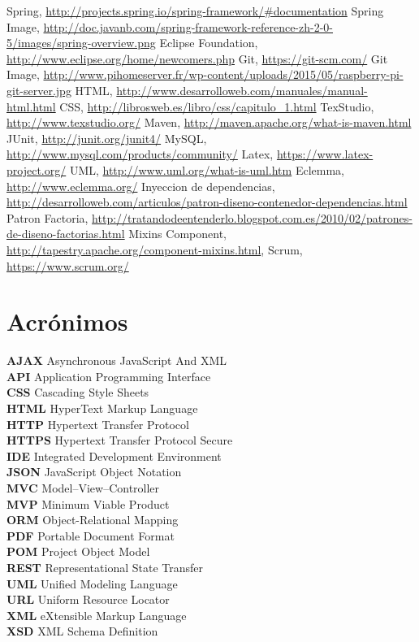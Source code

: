 \documentclass[12pt, a4paper, twoside]{book}
\begin{document}
	\begin{thebibliography}{99}
		Spring, \url{http://projects.spring.io/spring-framework/\#documentation}
		Spring Image,
		\url{http://doc.javanb.com/spring-framework-reference-zh-2-0-5/images/spring-overview.png}
		Eclipse Foundation, \url{http://www.eclipse.org/home/newcomers.php}
		Git, \url{https://git-scm.com/}
		Git Image, \url{http://www.pihomeserver.fr/wp-content/uploads/2015/05/raspberry-pi-git-server.jpg}
		HTML, \url{http://www.desarrolloweb.com/manuales/manual-html.html}
		CSS, \url{http://librosweb.es/libro/css/capitulo\_1.html}
		TexStudio, \url{http://www.texstudio.org/}
		Maven, \url{http://maven.apache.org/what-is-maven.html}
		JUnit, \url{http://junit.org/junit4/}
		MySQL, \url{http://www.mysql.com/products/community/}
		Latex, \url{https://www.latex-project.org/}
		UML, \url{http://www.uml.org/what-is-uml.htm}
		Eclemma, \url{http://www.eclemma.org/}
		Inyeccion de dependencias, \url{http://desarrolloweb.com/articulos/patron-diseno-contenedor-dependencias.html}
		Patron Factoria, \url{http://tratandodeentenderlo.blogspot.com.es/2010/02/patrones-de-diseno-factorias.html}
		Mixins Component,
		\url{http://tapestry.apache.org/component-mixins.html},
		Scrum,
		\url{https://www.scrum.org/}
	\end{thebibliography}
	\chapter{Acrónimos}
	\textbf{AJAX} Asynchronous JavaScript And XML\\
	\textbf{API} Application Programming Interface\\
	\textbf{CSS} Cascading Style Sheets\\
	\textbf{HTML} HyperText Markup Language\\
	\textbf{HTTP} Hypertext Transfer Protocol\\
	\textbf{HTTPS} Hypertext Transfer Protocol Secure\\
	\textbf{IDE} Integrated Development Environment\\
	\textbf{JSON} JavaScript Object Notation\\
	\textbf{MVC} Model–View–Controller\\
	\textbf{MVP} Minimum Viable Product\\
	\textbf{ORM} Object-Relational Mapping\\
	\textbf{PDF} Portable Document Format\\
	\textbf{POM} Project Object Model\\
	\textbf{REST} Representational State Transfer\\
	\textbf{UML} Unified Modeling Language\\
	\textbf{URL} Uniform Resource Locator\\
	\textbf{XML} eXtensible Markup Language\\
	\textbf{XSD} XML Schema Definition
	\appendix
\end{document}
